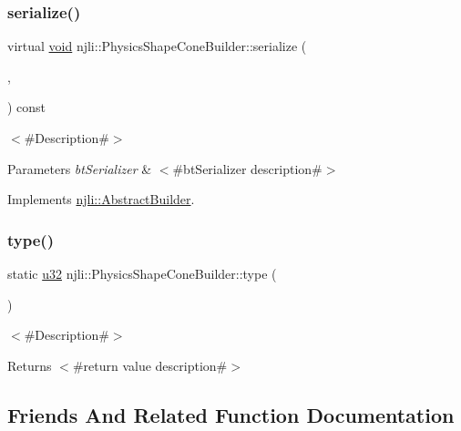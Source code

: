 \subsubsection{\texorpdfstring{serialize()}{serialize()}}
{\footnotesize\ttfamily virtual \mbox{\hyperlink{_thread_8h_af1e856da2e658414cb2456cb6f7ebc66}{void}} njli\+::\+Physics\+Shape\+Cone\+Builder\+::serialize (\begin{DoxyParamCaption}\item[{\mbox{\hyperlink{_thread_8h_af1e856da2e658414cb2456cb6f7ebc66}{void}} $\ast$}]{,  }\item[{bt\+Serializer $\ast$}]{ }\end{DoxyParamCaption}) const\hspace{0.3cm}{\ttfamily [virtual]}}

$<$\#\+Description\#$>$


\begin{DoxyParams}{Parameters}
{\em bt\+Serializer} & $<$\#bt\+Serializer description\#$>$ \\
\hline
\end{DoxyParams}


Implements \mbox{\hyperlink{classnjli_1_1_abstract_builder_ab66b774e02ccb9da554c9aab7fa6d981}{njli\+::\+Abstract\+Builder}}.

\mbox{\label{classnjli_1_1_physics_shape_cone_builder_a79efe7234069d916c0d743b7037abcfe}} 
\subsubsection{\texorpdfstring{type()}{type()}}
{\footnotesize\ttfamily static \mbox{\hyperlink{_util_8h_a10e94b422ef0c20dcdec20d31a1f5049}{u32}} njli\+::\+Physics\+Shape\+Cone\+Builder\+::type (\begin{DoxyParamCaption}{ }\end{DoxyParamCaption})\hspace{0.3cm}{\ttfamily [static]}}

$<$\#\+Description\#$>$

\begin{DoxyReturn}{Returns}
$<$\#return value description\#$>$ 
\end{DoxyReturn}


\subsection{Friends And Related Function Documentation}
\mbox{\label{classnjli_1_1_physics_shape_cone_builder_acb96ebb09abe8f2a37a915a842babfac}} 
